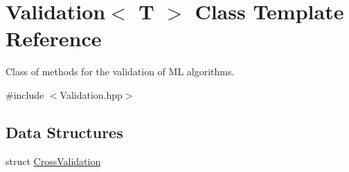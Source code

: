 \hypertarget{class_validation}{}\section{Validation$<$ T $>$ Class Template Reference}
\label{class_validation}


Class of methods for the validation of ML algorithms.  




{\ttfamily \#include $<$Validation.\+hpp$>$}

\subsection*{Data Structures}
\begin{DoxyCompactItemize}
\item 
struct \hyperlink{struct_validation_1_1_cross_validation}{Cross\+Validation}
\end{DoxyCompactItemize}
